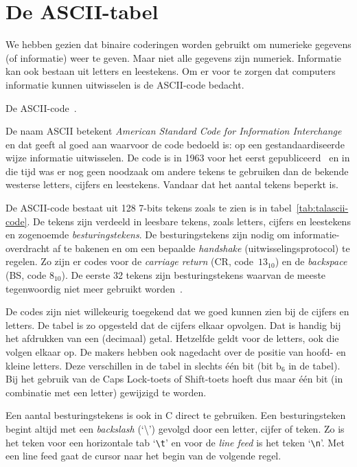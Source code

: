 \chapter{De ASCII-tabel}
\label{cha:asciitabel}
\thispagestyle{empty}

We hebben gezien dat binaire coderingen worden gebruikt om
numerieke gegevens (of informatie) weer te geven. Maar niet alle gegevens zijn numeriek.
Informatie kan ook bestaan uit letters en leestekens. Om er voor te zorgen dat
computers informatie kunnen uitwisselen is de ASCII-code bedacht.

\begin{table}[!p]
\caption{De ASCII-code~\cite{eijkhout2010ascii}.}
\label{tab:talascii-code}

\resizebox{\textwidth}{!}{}

\end{table}

De naam ASCII betekent \textsl{American Standard Code for Information Interchange} en
dat geeft al goed aan waarvoor de code bedoeld is: op een gestandaardiseerde wijze
informatie uitwisselen. De code is in 1963 voor het eerst gepubliceerd~\cite{asa1963ascii}
en in die tijd
was er nog geen noodzaak om andere tekens te gebruiken dan de bekende westerse letters,
cijfers en leestekens. Vandaar dat het aantal tekens beperkt is.

De ASCII-code bestaat uit 128 7-bits tekens zoals te zien is in
tabel~\ref{tab:talascii-code}. De tekens zijn verdeeld in leesbare tekens, zoals letters,
cijfers en leestekens en zogenoemde \textsl{besturingstekens}. De besturingstekens zijn nodig
om informatie-overdracht af te bakenen en om een bepaalde \textsl{handshake} 
(uitwisselingsprotocol) te regelen.
Zo zijn er codes voor de \textsl{carriage return} (CR, code~$13_{10}$) en de
\textsl{backspace} (BS, code $8_{10}$). De eerste 32 tekens zijn besturingstekens
waarvan de meeste tegenwoordig niet meer gebruikt worden~\cite{maini2007digital}.

De codes zijn niet willekeurig toegekend dat we goed kunnen zien bij de cijfers
en letters. De tabel is zo opgesteld dat de cijfers elkaar opvolgen. Dat is
handig bij het afdrukken van een (decimaal) getal.
Hetzelfde geldt voor de letters, ook die volgen elkaar op. De makers hebben ook nagedacht
over de positie van hoofd- en kleine letters. Deze verschillen in de tabel in slechts
\'{e}\'{e}n bit (bit b$_{6}$ in de tabel). Bij het gebruik van de Caps Lock-toets
of Shift-toets hoeft dus maar \'{e}\'{e}n bit (in combinatie met een letter) gewijzigd
te worden.

Een aantal besturingstekens is ook in C direct te gebruiken.
Een besturingsteken begint altijd met een \textsl{backslash} (`\textbackslash')
gevolgd door een letter, cijfer of teken. Zo is het teken voor een horizontale tab
`\texttt{\textbackslash t}' en voor de \textsl{line feed} is het teken
`\texttt{\textbackslash n}'. Met een line feed gaat de cursor naar het begin van de
volgende regel.


